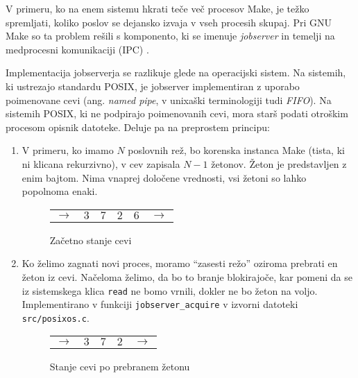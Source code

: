 \documentclass[notitlepage]{report}
\begin{document}
V primeru, ko na enem sistemu hkrati teče več procesov Make, je težko
spremljati, koliko poslov se dejansko izvaja v vseh procesih
skupaj. Pri GNU Make so ta problem rešili s komponento, ki se imenuje
\textit{jobserver} in temelji na medprocesni komunikaciji (IPC)
\cite{jobserver-impl}.

Implementacija jobserverja se razlikuje glede na operacijski
sistem. Na sistemih, ki ustrezajo standardu POSIX, je jobserver
implementiran z uporabo poimenovane cevi (ang. \textit{named pipe}, v
unixaški terminologiji tudi \textit{FIFO}). Na sistemih POSIX, ki ne
podpirajo poimenovanih cevi, mora starš podati otroškim procesom opisnik
datoteke. Deluje pa na preprostem principu:

\begin{enumerate}
\item V primeru, ko imamo $N$ poslovnih rež, bo korenska instanca Make
  (tista, ki ni klicana rekurzivno), v cev zapisala $N - 1$
  žetonov. Žeton je predstavljen z enim bajtom. Nima vnaprej določene
  vrednosti, vsi žetoni so lahko popolnoma enaki.

  \begin{figure}[H]
    \begin{center}
      \begin{tabular}{ cc|c|c|cc }
        \cline{2-5}
        $\rightarrow$ & $3$ & $7$ & $2$ & $6$ & $\rightarrow$ \\
        \cline{2-5}
      \end{tabular}
      \end{center}
    \caption{Začetno stanje cevi}
  \end{figure}
\item Ko želimo zagnati novi proces, moramo ``zasesti režo'' oziroma
  prebrati en žeton iz cevi. Načeloma želimo, da bo to branje
  blokirajoče, kar pomeni da se iz sistemskega klica \verb|read| ne
  bomo vrnili, dokler ne bo žeton na voljo. Implementirano v funkciji
  \verb|jobserver_acquire| v izvorni datoteki \verb|src/posixos.c|.
  
  \begin{figure}[H]
    \begin{center}
      \begin{tabular}{ cc|c|cc }
        \cline{2-4}
        $\rightarrow$ & $3$ & $7$ & $2$ & $\rightarrow$ \\
        \cline{2-4}
      \end{tabular}
      \end{center}
    \caption{Stanje cevi po prebranem žetonu}
  \end{figure}


\end{enumerate}
\end{document}
